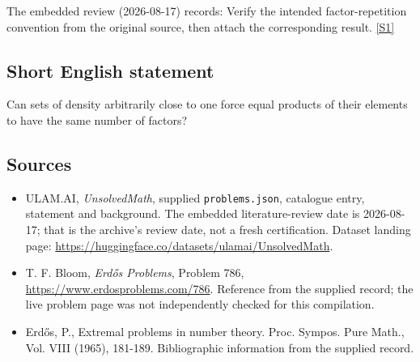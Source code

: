 \documentclass[11pt,a4paper]{article}
\newcommand{\sref}[2]{\hyperlink{source:#1:#2}{[S#2]}}
\begin{document}
The embedded review (2026-08-17) records: Verify the intended factor-repetition convention from the original source, then attach the corresponding result. \sref{statement}{1}

\subsection{Short English statement}

Can sets of density arbitrarily close to one force equal products of their elements to have the same number of factors?

\subsection{Sources}

{\small

\begin{itemize}

\item[\hypertarget{source:statement:1}{S1}] ULAM.AI, \emph{UnsolvedMath}, supplied \texttt{problems.json}, catalogue entry, statement and background. The embedded literature-review date is 2026-08-17; that is the archive’s review date, not a fresh certification. Dataset landing page: \url{https://huggingface.co/datasets/ulamai/UnsolvedMath}.

\item[\hypertarget{source:statement:2}{S2}] T. F. Bloom, \emph{Erdős Problems}, Problem 786, \url{https://www.erdosproblems.com/786}. Reference from the supplied record; the live problem page was not independently checked for this compilation.

\item[\hypertarget{source:statement:3}{S3}] Erd\H{o}s, P., Extremal problems in number theory. Proc. Sympos. Pure Math., Vol. VIII (1965), 181-189. Bibliographic information from the supplied record.

\end{itemize}

}

\label{end:statement}
\end{document}
